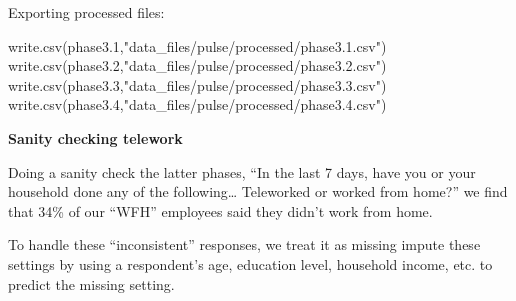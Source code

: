 \documentclass[
]{article}
\newenvironment{Shaded}{\begin{snugshade}}{\end{snugshade}}
\newcommand{\FloatTok}[1]{\textcolor[rgb]{0.00,0.00,0.81}{#1}}
\newcommand{\FunctionTok}[1]{\textcolor[rgb]{0.00,0.00,0.00}{#1}}
\newcommand{\NormalTok}[1]{#1}
\newcommand{\StringTok}[1]{\textcolor[rgb]{0.31,0.60,0.02}{#1}}
\begin{document}
Exporting processed files:

\begin{Shaded}
\begin{Highlighting}[]
\FunctionTok{write.csv}\NormalTok{(phase3}\FloatTok{.1}\NormalTok{,}\StringTok{"data\_files/pulse/processed/phase3.1.csv"}\NormalTok{)}
\FunctionTok{write.csv}\NormalTok{(phase3}\FloatTok{.2}\NormalTok{,}\StringTok{"data\_files/pulse/processed/phase3.2.csv"}\NormalTok{)}
\FunctionTok{write.csv}\NormalTok{(phase3}\FloatTok{.3}\NormalTok{,}\StringTok{"data\_files/pulse/processed/phase3.3.csv"}\NormalTok{)}
\FunctionTok{write.csv}\NormalTok{(phase3}\FloatTok{.4}\NormalTok{,}\StringTok{"data\_files/pulse/processed/phase3.4.csv"}\NormalTok{)}
\end{Highlighting}
\end{Shaded}

\textbf{Sanity checking telework}

Doing a sanity check the latter phases, ``In the last 7 days, have you
or your household done any of the following\ldots{} Teleworked or worked
from home?'' we find that 34\% of our ``WFH'' employees said they didn't
work from home.

To handle these ``inconsistent'' responses, we treat it as missing
impute these settings by using a respondent's age, education level,
household income, etc. to predict the missing setting.
\end{document}
